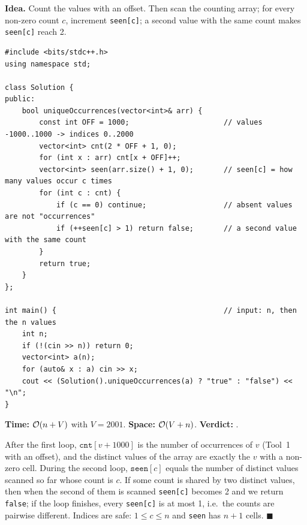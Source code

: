\begin{algorithmbox}
\textbf{Idea.} Count the values with an offset. Then scan the counting array; for every non-zero count $c$, increment \texttt{seen[c]}; a second value with the same count makes \texttt{seen[c]} reach 2.
\begin{lstlisting}[style=cpp]
#include <bits/stdc++.h>
using namespace std;

class Solution {
public:
    bool uniqueOccurrences(vector<int>& arr) {
        const int OFF = 1000;                      // values -1000..1000 -> indices 0..2000
        vector<int> cnt(2 * OFF + 1, 0);
        for (int x : arr) cnt[x + OFF]++;
        vector<int> seen(arr.size() + 1, 0);       // seen[c] = how many values occur c times
        for (int c : cnt) {
            if (c == 0) continue;                  // absent values are not "occurrences"
            if (++seen[c] > 1) return false;       // a second value with the same count
        }
        return true;
    }
};

int main() {                                       // input: n, then the n values
    int n;
    if (!(cin >> n)) return 0;
    vector<int> a(n);
    for (auto& x : a) cin >> x;
    cout << (Solution().uniqueOccurrences(a) ? "true" : "false") << "\n";
}
\end{lstlisting}
\begin{complexitybox}
\textbf{Time:} $\mathcal{O}(n + V)$ with $V = 2001$. \textbf{Space:} $\mathcal{O}(V + n)$. \textbf{Verdict:} \ac{}.
\end{complexitybox}
\end{algorithmbox}

\begin{invariantbox}
After the first loop, $\texttt{cnt}[v + 1000]$ is the number of occurrences of $v$ (Tool~1 with an offset), and the distinct values of the array are exactly the $v$ with a non-zero cell. During the second loop, $\texttt{seen}[c]$ equals the number of distinct values scanned so far whose count is $c$. If some count is shared by two distinct values, then when the second of them is scanned \texttt{seen[c]} becomes 2 and we return \texttt{false}; if the loop finishes, every \texttt{seen[c]} is at most 1, i.e.\ the counts are pairwise different. Indices are safe: $1 \le c \le n$ and \texttt{seen} has $n+1$ cells. \hfill$\blacksquare$
\end{invariantbox}

